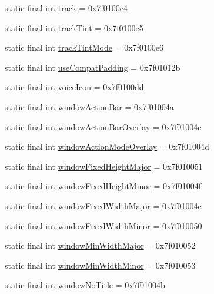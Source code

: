 \begin{CompactItemize}
\item 
static final int \hyperlink{classandroid_1_1support_1_1v4_1_1_r_1_1attr_ceb5894dc0bb984160f647155b7323b5}{track} = 0x7f0100e4
\item 
static final int \hyperlink{classandroid_1_1support_1_1v4_1_1_r_1_1attr_a3b33de16b6102b58a0026448e51e9c2}{trackTint} = 0x7f0100e5
\item 
static final int \hyperlink{classandroid_1_1support_1_1v4_1_1_r_1_1attr_a7f994dd64217d61dbfd111e7bb5c657}{trackTintMode} = 0x7f0100e6
\item 
static final int \hyperlink{classandroid_1_1support_1_1v4_1_1_r_1_1attr_53bef6bde9aa190aee3625ff94ed4571}{useCompatPadding} = 0x7f01012b
\item 
static final int \hyperlink{classandroid_1_1support_1_1v4_1_1_r_1_1attr_a308d75d002b6dfb8d612ca7faf303db}{voiceIcon} = 0x7f0100dd
\item 
static final int \hyperlink{classandroid_1_1support_1_1v4_1_1_r_1_1attr_a50eb8340be48311419382e35ced28bd}{windowActionBar} = 0x7f01004a
\item 
static final int \hyperlink{classandroid_1_1support_1_1v4_1_1_r_1_1attr_8872448943079550605a1d24f4d5a0ac}{windowActionBarOverlay} = 0x7f01004c
\item 
static final int \hyperlink{classandroid_1_1support_1_1v4_1_1_r_1_1attr_2967f23da698b29669ce8231d75639e5}{windowActionModeOverlay} = 0x7f01004d
\item 
static final int \hyperlink{classandroid_1_1support_1_1v4_1_1_r_1_1attr_747d79226b180952cadf839f81936a2a}{windowFixedHeightMajor} = 0x7f010051
\item 
static final int \hyperlink{classandroid_1_1support_1_1v4_1_1_r_1_1attr_07e64c320b914757f635892414aaadec}{windowFixedHeightMinor} = 0x7f01004f
\item 
static final int \hyperlink{classandroid_1_1support_1_1v4_1_1_r_1_1attr_97e6892fb2397919e01eeea68749f138}{windowFixedWidthMajor} = 0x7f01004e
\item 
static final int \hyperlink{classandroid_1_1support_1_1v4_1_1_r_1_1attr_8b94c2369e4fc6589539a752c6ef2341}{windowFixedWidthMinor} = 0x7f010050
\item 
static final int \hyperlink{classandroid_1_1support_1_1v4_1_1_r_1_1attr_e2cd817c2daf3add3a99f8ec23336e15}{windowMinWidthMajor} = 0x7f010052
\item 
static final int \hyperlink{classandroid_1_1support_1_1v4_1_1_r_1_1attr_9fd4e34aa7a7b94a60e07ee5f9f4836a}{windowMinWidthMinor} = 0x7f010053
\item 
static final int \hyperlink{classandroid_1_1support_1_1v4_1_1_r_1_1attr_2881559b1afe2d87b247be4bbdc651db}{windowNoTitle} = 0x7f01004b
\end{CompactItemize}


